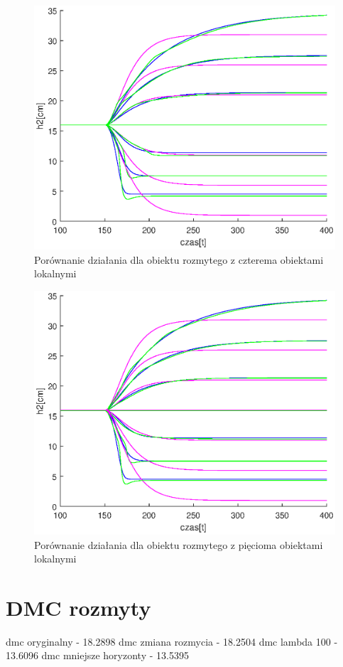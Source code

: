 		\begin{figure}[h!]
			\includegraphics[width=0.9\linewidth]{plots/z2_modelroz_4p.eps}
			\caption{Porównanie działania dla obiektu rozmytego z czterema obiektami lokalnymi}
			\label{rys:roz4p}
		\end{figure}
		\begin{figure}[h!]
			\includegraphics[width=0.9\linewidth]{plots/z2_modelroz_5p.eps}
			\caption{Porównanie działania dla obiektu rozmytego z pięcioma obiektami lokalnymi}
			\label{rys:roz5p}
		\end{figure}
	\newpage
	\section{DMC rozmyty}
	dmc oryginalny - 18.2898
	dmc zmiana rozmycia - 18.2504
	dmc lambda 100 - 13.6096
	dmc mniejsze horyzonty - 13.5395
		